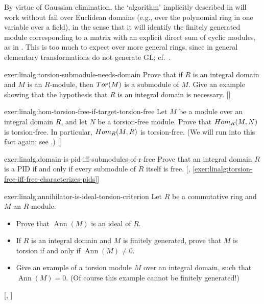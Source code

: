By virtue of Gaussian elimination, the `algorithm' implicitly
described in  will work without fail over Euclidean
domains (e.g., over the polynomial ring in one variable over a field),
in the sense that it will identify the finitely generated module
corresponding to a matrix with an explicit direct sum of cyclic
modules, as in . This is too much to expect over
more general rings, since in general elementary transformations do not
generate $\mathrm{GL}$; cf.\ .
\begin{exer}{\exerused}{exer:linalg:torsion-submodule-needs-domain}
  Prove that if $R$ is an integral domain and $M$ is an $R$-module,
  then $Tor(M)$ is a submodule of $M$. Give an example showing that
  the hypothesis that $R$ is an integral domain is necessary.
  []
\end{exer}
\begin{exer}{\exerused}{exer:linalg:hom-torsion-free-if-target-torsion-free}
  Let $M$ be a module over an integral domain $R$, and let $N$ be a
  torsion-free module. Prove that $Hom_R(M,N)$ is torsion-free. In
  particular, $Hom_R(M,R)$ is torsion-free. (We will run into this
  fact again; see .)
  []
\end{exer}
\begin{exer}{\exerused}{exer:linalg:domain-is-pid-iff-submodules-of-r-free}
  Prove that an integral domain $R$ is a PID if and only if every
  submodule of $R$ itself is free. [,
  \ref{exer:linalg:torsion-free-iff-free-characterizes-pids}]
\end{exer}
\begin{exer}{\exerused}{exer:linalg:annihilator-is-ideal-torsion-criterion}
  Let $R$ be a commutative ring and $M$ an $R$-module.
  \begin{itemize}
  \item Prove that $\operatorname{Ann}(M)$ is an ideal of $R$.
  \item If $R$ is an integral domain and $M$ is finitely generated,
    prove that $M$ is torsion if and only if
    $\operatorname{Ann}(M) \neq 0$.
  \item Give an example of a torsion module $M$ over an integral
    domain, such that $\operatorname{Ann}(M) = 0$. (Of course this
    example cannot be finitely generated!)
  \end{itemize}
  [,
  ]
\end{exer}
